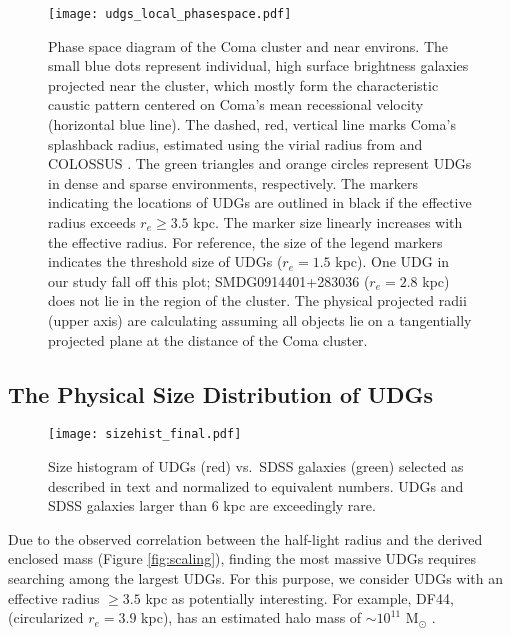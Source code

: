 \documentclass[twocolumn,tighten]{aastex63}
\begin{document}
\begin{figure}
\texttt{[image: udgs\_local\_phasespace.pdf]}
\caption{Phase space diagram of the Coma cluster and near environs. The small blue dots represent individual, high surface brightness galaxies projected near the cluster, which mostly form the characteristic caustic pattern centered on Coma's mean recessional velocity (horizontal blue line). The dashed, red, vertical line marks Coma's splashback radius, estimated using the virial radius from \cite{Kubo2007} and COLOSSUS \citep{colossus}.
The green triangles and orange circles represent UDGs in dense and sparse environments, respectively. The markers indicating the locations of UDGs are outlined in black if the effective radius exceeds $r_e \geq 3.5$ kpc. The marker size linearly increases with the effective radius. For reference, the size of the legend markers indicates the threshold size of UDGs ($r_e = 1.5$ kpc). One UDG in our study fall off this plot;
SMDG0914401+283036 ($r_e=2.8$ kpc) does not lie in the region of the cluster. The physical projected radii (upper axis) are calculating assuming all objects lie on a tangentially projected plane at the distance of the Coma cluster.}
\label{fig:phase_space}
\end{figure}

\subsection{The Physical Size Distribution of UDGs}
\label{sec:size_distribution}

\begin{figure}
\texttt{[image: sizehist\_final.pdf]}
\caption{Size histogram of UDGs (red) vs.\ SDSS galaxies (green) selected as described in text and normalized to equivalent numbers. UDGs and SDSS galaxies larger than 6 kpc are exceedingly rare.}
\label{fig:size_hist}
\end{figure}

Due to the observed correlation between the half-light radius and the derived enclosed mass (Figure \ref{fig:scaling}), finding the most massive UDGs requires searching among the largest UDGs. For this purpose, we consider UDGs with an effective radius $\geq 3.5$ kpc as potentially interesting. 
For example, DF44, (circularized $r_e = 3.9$ kpc), has an estimated halo mass of $\sim 10^{11}$ M$_\odot$ \citep{vanDokkum2019b,Saifollahi2020}.
\end{document}
